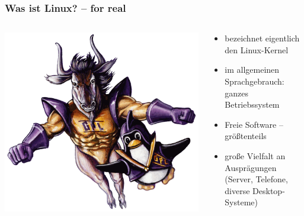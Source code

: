 \documentclass[t]{beamer}
\begin{document}
\begin{frame}
  \frametitle{Was ist Linux? – for real}
  \begin{columns}
    \begin{column}[T]{0.45\textwidth}
      \includegraphics[width=\textwidth]{img-src/linux-gnu.png}
    \end{column}
    \begin{column}{0.45\textwidth}
      \begin{itemize}
      \item bezeichnet eigentlich den Linux-Kernel
      \item im allgemeinen Sprachgebrauch: ganzes Betriebssystem
      \item Freie Software – größtenteils
      \item große Vielfalt an Ausprägungen (Server, Telefone, diverse
        Desktop-Systeme)
      \end{itemize}
    \end{column}
  \end{columns}
\end{frame}

\end{document}
